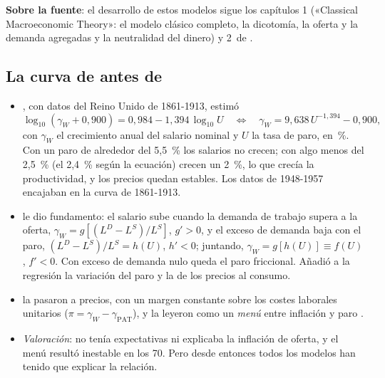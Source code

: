 \documentclass[11pt]{article}
\begin{document}
\begin{anotaciones}
\textbf{Sobre la fuente}: el desarrollo de estos modelos sigue los capítulos 1 («Classical Macroeconomic Theory»: el modelo clásico completo, la dicotomía, la oferta y la demanda agregadas y la neutralidad del dinero) y 2~de \textcite{Serletis2007Demand}.
\end{anotaciones}

\subsection{La curva de  antes de }\label{anexo:phillips-historia}

\begin{itemize}
\item \textcite{Phillips1958}, con datos del Reino Unido de 1861-1913, estimó 
  \begin{equation*}
  \log_{10}(\gamma_W+0{,}900)=0{,}984-1{,}394\,\log_{10}U\quad\Longleftrightarrow\quad\gamma_W=9{,}638\,U^{-1{,}394}-0{,}900,
  \end{equation*}
  con $\gamma_W$ el crecimiento anual del salario nominal y $U$ la tasa de paro, en~\%. Con un paro de alrededor del 5,5~\% los salarios no crecen; con algo menos del 2,5~\% (el 2,4~\% según la ecuación) crecen un 2~\%, lo que crecía la productividad, y los precios quedan estables. Los datos de 1948-1957 encajaban en la curva de 1861-1913.
\item \textcite{Lipsey1960Relation} le dio fundamento: el salario sube cuando la demanda de trabajo supera a la oferta, $\gamma_W=g[(L^D-L^S)/L^S]$, $g'>0$, y el exceso de demanda baja con el paro, $(L^D-L^S)/L^S=h(U)$, $h'<0$; juntando, $\gamma_W=g[h(U)]\equiv f(U)$, $f'<0$. Con exceso de demanda nulo queda el paro friccional. Añadió a la regresión la variación del paro y la de los precios al consumo.
\item \textcite{SamuelsonSolow1960Analytical} la pasaron a precios, con un margen constante sobre los costes laborales unitarios ($\pi=\gamma_W-\gamma_{\mathrm{PAT}}$), y la leyeron como un \emph{menú} entre inflación y paro .
\item \emph{Valoración}: no tenía expectativas ni explicaba la inflación de oferta, y el menú resultó inestable en los 70. Pero desde entonces todos los modelos han tenido que explicar la relación\nocite{Akerlof2002Behavioral}.
\end{itemize}

\end{document}
